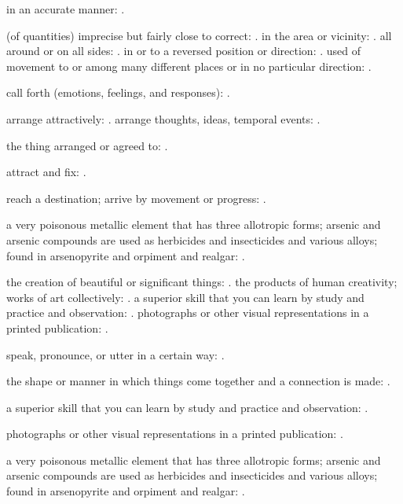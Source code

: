   in an accurate manner: .

  (of quantities) imprecise but fairly close to correct: . in the area or vicinity: . all around or on all sides: . in or to a reversed position or direction: . used of movement to or among many different places or in no particular direction: .

  call forth (emotions, feelings, and responses): .

  arrange attractively: . arrange thoughts, ideas, temporal events: .

  the thing arranged or agreed to: .

  attract and fix: .

  reach a destination; arrive by movement or progress: .

  a very poisonous metallic element that has three allotropic forms; arsenic and arsenic compounds are used as herbicides and insecticides and various alloys; found in arsenopyrite and orpiment and realgar: .

  the creation of beautiful or significant things: . the products of human creativity; works of art collectively: . a superior skill that you can learn by study and practice and observation: . photographs or other visual representations in a printed publication: .

  speak, pronounce, or utter in a certain way: .

  the shape or manner in which things come together and a connection is made: .

  a superior skill that you can learn by study and practice and observation: .

  photographs or other visual representations in a printed publication: .

  a very poisonous metallic element that has three allotropic forms; arsenic and arsenic compounds are used as herbicides and insecticides and various alloys; found in arsenopyrite and orpiment and realgar: .

